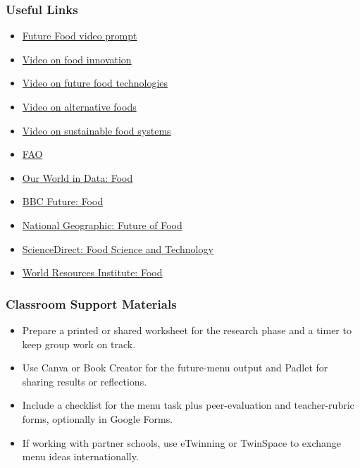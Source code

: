 \documentclass[11pt, a4paper]{article}
\begin{document}
\subsubsection*{Useful Links}
\begin{itemize}
    \item \href{https://youtube.com/shorts/BunibcUKTZ4?si=FzLZJ1rXxTooXy1o}{Future Food video prompt}
    \item \href{https://www.youtube.com/watch?v=awoeNtD-k2s&t=51s}{Video on food innovation}
    \item \href{https://www.youtube.com/watch?v=XRTVg7hA3mU&t=12s}{Video on future food technologies}
    \item \href{https://www.youtube.com/watch?v=bZmv2bIsroE}{Video on alternative foods}
    \item \href{https://www.youtube.com/watch?v=LV2jIkOwYl8}{Video on sustainable food systems}
    \item \href{https://www.fao.org}{FAO}
    \item \href{https://ourworldindata.org/food}{Our World in Data: Food}
    \item \href{https://www.bbc.com/future/columns/food}{BBC Future: Food}
    \item \href{https://www.nationalgeographic.com/environment/article/future-food}{National Geographic: Future of Food}
    \item \href{https://www.sciencedirect.com/journal/food-science-and-technology}{ScienceDirect: Food Science and Technology}
    \item \href{https://www.wri.org/topics/food}{World Resources Institute: Food}
\end{itemize}

\subsubsection*{Classroom Support Materials}
\begin{itemize}
    \item Prepare a printed or shared worksheet for the research phase and a timer to keep group work on track.
    \item Use Canva or Book Creator for the future-menu output and Padlet for sharing results or reflections.
    \item Include a checklist for the menu task plus peer-evaluation and teacher-rubric forms, optionally in Google Forms.
    \item If working with partner schools, use eTwinning or TwinSpace to exchange menu ideas internationally.
\end{itemize}
\end{document}
